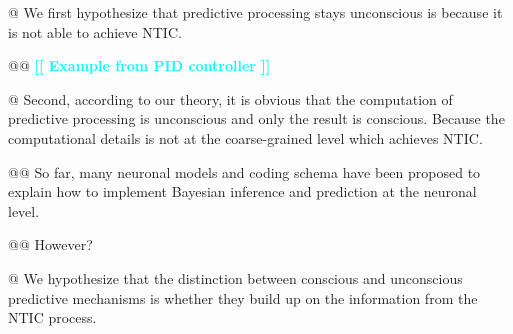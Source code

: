 \documentclass[utf8]{article}
\newenvironment{ants}
			{
			 \begin{easylist}[itemize]		
		 	}
			{
			\end{easylist}
			}
\newcommand{\toWrite}[1]{\noindent
			\textcolor{Cyan}{\textbf{[[ #1 ]]}}}
\begin{document}
\begin{ants}
				
				
				
				
				@ We first hypothesize that predictive processing stays unconscious is because it is not able to achieve NTIC. 
				
					@@ \toWrite{Example from PID controller}
					
				@ Second, according to our theory, it is obvious that the computation of predictive processing is unconscious and only the result is conscious. Because the computational details is not at the coarse-grained level which achieves NTIC. 
				
					@@ So far, many neuronal models and coding schema have been proposed to explain how to implement Bayesian inference and prediction at the neuronal level.  
					
					@@ However?
				
				
				@ We hypothesize that the distinction between conscious and unconscious predictive mechanisms is whether they build up on the information from the NTIC process. 
				
				
				
				
				 
			\end{ants}
		
		
		
\end{document}
